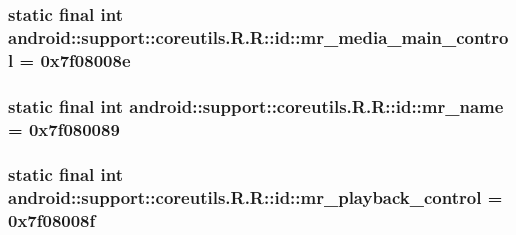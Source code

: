 \hypertarget{classandroid_1_1support_1_1coreutils_1_1_r_1_1id_a5677556201b022a4fa87cb93173f8eb}{
\subsubsection[{mr\_\-media\_\-main\_\-control}]{\setlength{\rightskip}{0pt plus 5cm}static final int android::support::coreutils.R.R::id::mr\_\-media\_\-main\_\-control = 0x7f08008e}}
\label{classandroid_1_1support_1_1coreutils_1_1_r_1_1id_a5677556201b022a4fa87cb93173f8eb}


\hypertarget{classandroid_1_1support_1_1coreutils_1_1_r_1_1id_6d9efab7980c7b416965168452614d93}{
\subsubsection[{mr\_\-name}]{\setlength{\rightskip}{0pt plus 5cm}static final int android::support::coreutils.R.R::id::mr\_\-name = 0x7f080089}}
\label{classandroid_1_1support_1_1coreutils_1_1_r_1_1id_6d9efab7980c7b416965168452614d93}


\hypertarget{classandroid_1_1support_1_1coreutils_1_1_r_1_1id_5fb3848a29199563c5c61fa0e1ffc5c9}{
\subsubsection[{mr\_\-playback\_\-control}]{\setlength{\rightskip}{0pt plus 5cm}static final int android::support::coreutils.R.R::id::mr\_\-playback\_\-control = 0x7f08008f}}
\label{classandroid_1_1support_1_1coreutils_1_1_r_1_1id_5fb3848a29199563c5c61fa0e1ffc5c9}


